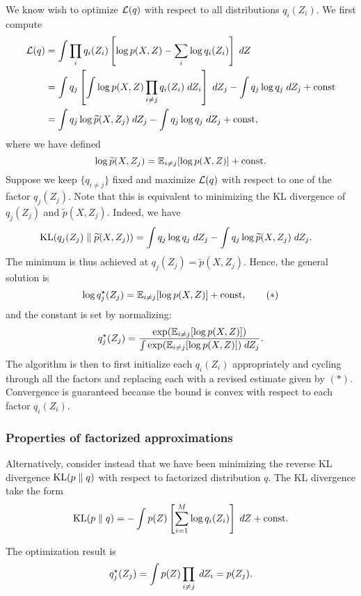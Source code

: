 \documentclass[a4paper]{article}
\begin{document}
We know wish to optimize $\mathcal{L}(q)$ with respect to all distributions
$q_i(Z_i)$. We first compute
\[
\begin{aligned}
\mathcal{L}(q)
&= \int \prod_i q_i(Z_i) \left[ \log p(X, Z) - \sum_i
\log q_i(Z_i) \right] \; d Z \\
&= \int q_j \left[ \int \log p(X, Z) \prod_{i \neq j}
q_i(Z_i) \; d Z_i \right] \; d Z_j
- \int q_j \log q_j \; d Z_j + \mathrm{const} \\
&= \int q_j \log \widetilde{p} (X, Z_j) \; d Z_j
- \int q_j \log q_j \; d Z_j + \mathrm{const},
\end{aligned}
\]
where we have defined
\[
\log \widetilde{p} (X, Z_j) = \mathbb{E}_{i \neq j}
[\log p(X, Z)] + \mathrm{const}.
\]
Suppose we keep $\{q_{i \neq j}\}$ fixed and maximize
$\mathcal{L}(q)$ with respect to one of the factor
$q_j(Z_j)$. Note that this is equivalent
to minimizing the KL divergence of $q_j(Z_j)$ and $\tilde{p}
(X, Z_j)$. Indeed, we have 
\[
\begin{aligned}
\mathrm{KL}(q_j (Z_j) \; \Vert \; \widetilde{p}(X, Z_j)) 
&= \int q_j \log q_j \; d Z_j 
- \int q_j \log \widetilde{p} (X, Z_j) \; d Z_j. 
\end{aligned}
\]
The minimum is thus achieved at $q_j(Z_j)
= \tilde{p} (X, Z_j)$. Hence, the general solution is
\begin{equation*}
  \log q_j^\star (Z_j) = \mathbb{E}_{i \neq j} [\log p(X, Z)] +
  \mathrm{const},
  \tag{$*$}
\end{equation*}
and the constant is set by normalizing:
\[
q^\star_j(Z_j)
= \frac{\exp (\mathbb{E}_{i \neq j} [\log p(X, Z)])}
{\int \exp (\mathbb{E}_{i \neq j} [\log p(X, Z)]) \; d Z_j}.
\]
The algorithm is then to first initialize each $q_i (Z_i)$
appropriately and cycling through all the factors and
replacing each with a revised estimate given by $(*)$.
Convergence is guaranteed because the bound is convex
with respect to each factor $q_i(Z_i)$.

\subsubsection{Properties of factorized approximations}

Alternatively, consider instead that we have been minimizing 
the reverse KL divergence $\mathrm{KL}(p \; \Vert \; q)$ with respect to 
factorized distribution $q$. The KL divergence
take the form 
\[
\mathrm{KL}(p \; \Vert \; q) = - \int p(Z) \left[ \sum_{i=1}^M \log q_i 
(Z_i) \right] \; d Z + \mathrm{const}.
\]


The optimization result is 
\[
q_j^\star (Z_j) = \int p(Z) \prod_{i \neq j} \; d Z_i = p(Z_j).
\]
\end{document}
